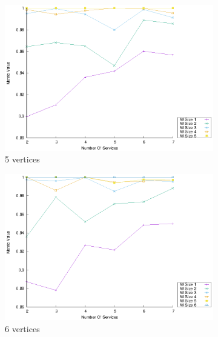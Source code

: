 \begin{figure}[!htb]
\begin{subfigure}{0.33\textwidth}
    \includegraphics[width=\textwidth]{Images/graphs/window_quality_performance_diff_qual_n7_s7_20_100_n5}
    \caption{5 vertices}
    \label{fig:quality_window_average_qualitative_n5}
  \end{subfigure}
  \hfill
  \begin{subfigure}{0.33\textwidth}
    \includegraphics[width=\textwidth]{Images/graphs/window_quality_performance_diff_qual_n7_s7_20_100_n6}
    \caption{6 vertices}
    \label{fig:quality_window_wide_qualitative_n6}
  \end{subfigure}
  \begin{subfigure}{0.33\textwidth}

\end{subfigure}
\end{figure}
